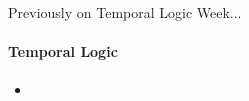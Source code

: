 
\begin{frame}{Previously on Temporal Logic Week...}
  \framesubtitle{Temporal Logic}
  \begin{itemize}
	\item
  \end{itemize}

\end{frame}